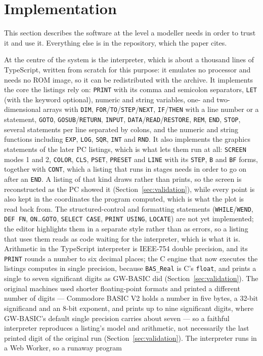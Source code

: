 \section{Implementation}
\label{sec:implementation}

This section describes the software at the level a modeller needs in order to trust it and use it. Everything else is in the repository, which the paper cites.

At the centre of the system is the interpreter, which is about a thousand lines of TypeScript, written from scratch for this purpose: it emulates no processor and needs no ROM image, so it can be redistributed with the archive. It implements the core the listings rely on: \texttt{PRINT} with its comma and semicolon separators, \texttt{LET} (with the keyword optional), numeric and string variables, one- and two-dimensional arrays with \texttt{DIM}, \texttt{FOR}/\texttt{TO}/\texttt{STEP}/\texttt{NEXT}, \texttt{IF}/\texttt{THEN} with a line number or a statement, \texttt{GOTO}, \texttt{GOSUB}/\texttt{RETURN}, \texttt{INPUT}, \texttt{DATA}/\texttt{READ}/\texttt{RESTORE}, \texttt{REM}, \texttt{END}, \texttt{STOP}, several statements per line separated by colons, and the numeric and string functions including \texttt{EXP}, \texttt{LOG}, \texttt{SQR}, \texttt{INT} and \texttt{RND}. It also implements the graphics statements of the later PC listings, which is what lets them run at all: \texttt{SCREEN} modes 1 and 2, \texttt{COLOR}, \texttt{CLS}, \texttt{PSET}, \texttt{PRESET} and \texttt{LINE} with its \texttt{STEP}, \texttt{B} and \texttt{BF} forms, together with \texttt{CONT}, which a listing that runs in stages needs in order to go on after an \texttt{END}. A listing of that kind draws rather than prints, so the screen is reconstructed as the PC showed it (Section~\ref{sec:validation}), while every point is also kept in the coordinates the program computed, which is what the plot is read back from. The structured-control and formatting statements (\texttt{WHILE}/\texttt{WEND}, \texttt{DEF FN}, \texttt{ON}\ldots\texttt{GOTO}, \texttt{SELECT CASE}, \texttt{PRINT USING}, \texttt{LOCATE}) are not yet implemented; the editor highlights them in a separate style rather than as errors, so a listing that uses them reads as code waiting for the interpreter, which is what it is. Arithmetic in the TypeScript interpreter is IEEE-754 double precision, and its \texttt{PRINT} rounds a number to six decimal places; the C engine that now executes the listings computes in single precision, because \texttt{BAS\_Real} is C's \texttt{float}, and prints a single to seven significant digits as GW-BASIC did (Section~\ref{sec:validation}). The original machines used shorter floating-point formats and printed a different number of digits --- Commodore BASIC V2 holds a number in five bytes, a 32-bit significand and an 8-bit exponent, and prints up to nine significant digits, where GW-BASIC's default single precision carries about seven --- so a faithful interpreter reproduces a listing's model and arithmetic, not necessarily the last printed digit of the original run (Section~\ref{sec:validation}). The interpreter runs in a Web Worker, so a runaway program 
